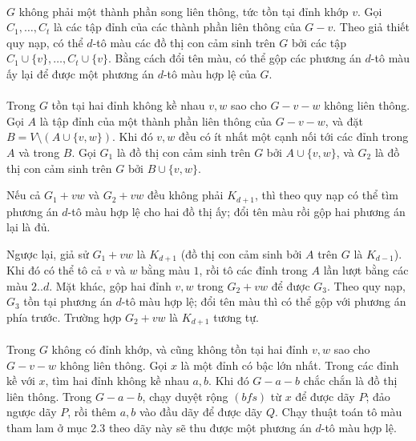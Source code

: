 \documentclass[11pt]{article}
\begin{document}
\paragraph{}
\(G\) không phải một thành phần song liên thông, tức tồn tại đỉnh khớp \(v\).
Gọi \(C_1,\ldots,C_t\) là các tập đỉnh của các thành phần liên thông của
\(G-v\). Theo giả thiết quy nạp, có thể \(d\)-tô màu các đồ thị con cảm sinh
trên \(G\) bởi các tập \(C_1\cup\{v\},\ldots,C_t\cup\{v\}\). Bằng cách đổi tên
màu, có thể gộp các phương án \(d\)-tô màu ấy lại để được một phương án
\(d\)-tô màu hợp lệ của \(G\).

\paragraph{}
Trong \(G\) tồn tại hai đỉnh không kề nhau \(v,w\) sao cho \(G-v-w\) không
liên thông. Gọi \(A\) là tập đỉnh của một thành phần liên thông của
\(G-v-w\), và đặt \(B=V\setminus(A\cup\{v,w\})\). Khi đó \(v,w\) đều có ít
nhất một cạnh nối tới các đỉnh trong \(A\) và trong \(B\). Gọi \(G_1\) là đồ
thị con cảm sinh trên \(G\) bởi \(A\cup\{v,w\}\), và \(G_2\) là đồ thị con cảm
sinh trên \(G\) bởi \(B\cup\{v,w\}\).

Nếu cả \(G_1+vw\) và \(G_2+vw\) đều không phải \(K_{d+1}\), thì theo quy nạp
có thể tìm phương án \(d\)-tô màu hợp lệ cho hai đồ thị ấy; đổi tên màu rồi
gộp hai phương án lại là đủ.

Ngược lại, giả sử \(G_1+vw\) là \(K_{d+1}\) (đồ thị con cảm sinh bởi \(A\)
trên \(G\) là \(K_{d-1}\)). Khi đó có thể tô cả \(v\) và \(w\) bằng màu \(1\),
rồi tô các đỉnh trong \(A\) lần lượt bằng các màu \(2..d\). Mặt khác, gộp hai
đỉnh \(v,w\) trong \(G_2+vw\) để được \(G_3\). Theo quy nạp, \(G_3\) tồn tại
phương án \(d\)-tô màu hợp lệ; đổi tên màu thì có thể gộp với phương án phía
trước. Trường hợp \(G_2+vw\) là \(K_{d+1}\) tương tự.

\paragraph{}
Trong \(G\) không có đỉnh khớp, và cũng không tồn tại hai đỉnh \(v,w\) sao cho
\(G-v-w\) không liên thông. Gọi \(x\) là một đỉnh có bậc lớn nhất. Trong các
đỉnh kề với \(x\), tìm hai đỉnh không kề nhau \(a,b\). Khi đó \(G-a-b\) chắc
chắn là đồ thị liên thông. Trong \(G-a-b\), chạy duyệt rộng \((bfs)\) từ \(x\)
để được dãy \(P\); đảo ngược dãy \(P\), rồi thêm \(a,b\) vào đầu dãy để được
dãy \(Q\). Chạy thuật toán tô màu tham lam ở mục 2.3 theo dãy này sẽ thu được
một phương án \(d\)-tô màu hợp lệ.
\end{document}
